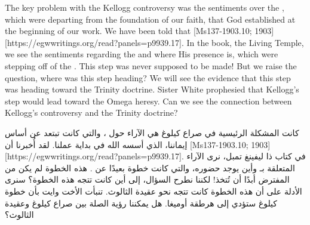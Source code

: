 



The key problem with the Kellogg controversy was the sentiments over the , which were departing from the foundation of our faith, that God established at the beginning of our work. We have been told that [Ms137-1903.10; 1903][https://egwwritings.org/read?panels=p9939.17]. In the book, the Living Temple, we see the sentiments regarding the  and where His presence is, which were stepping off of the . This step was never supposed to be made! But we raise the question, where was this step heading? We will see the evidence that this step was heading toward the Trinity doctrine. Sister White prophesied that Kellogg’s step would lead toward the Omega heresy. Can we see the connection between Kellogg’s controversy and the Trinity doctrine?


كانت المشكلة الرئيسية في صراع كيلوغ هي الآراء حول ، والتي كانت تبتعد عن أساس إيماننا، الذي أسسه الله في بداية عملنا. لقد أُخبرنا أن [Ms137-1903.10; 1903][https://egwwritings.org/read?panels=p9939.17]. في كتاب ذا ليفينغ تمبل، نرى الآراء المتعلقة بـ  وأين يوجد حضوره، والتي كانت خطوة بعيدًا عن . هذه الخطوة لم يكن من المفترض أبدًا أن تُتخذ! لكننا نطرح السؤال، إلى أين كانت تتجه هذه الخطوة؟ سنرى الأدلة على أن هذه الخطوة كانت تتجه نحو عقيدة الثالوث. تنبأت الأخت وايت بأن خطوة كيلوغ ستؤدي إلى هرطقة أوميغا. هل يمكننا رؤية الصلة بين صراع كيلوغ وعقيدة الثالوث؟


